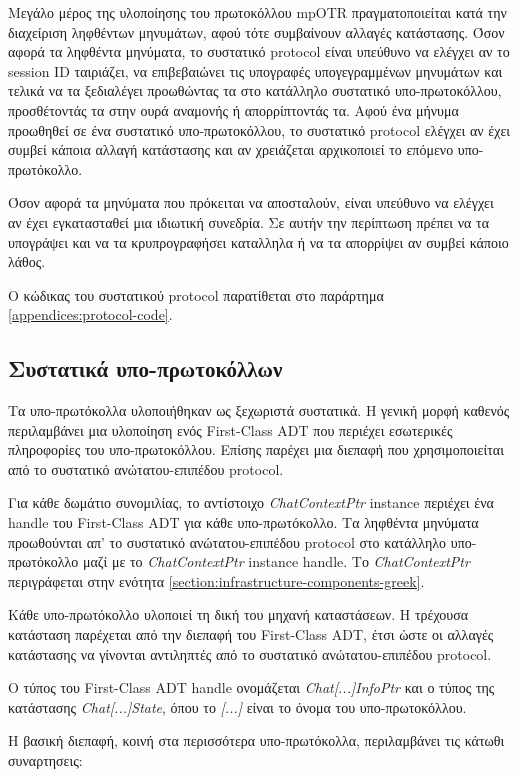 Μεγάλο μέρος της υλοποίησης του πρωτοκόλλου mpOTR πραγματοποιείται κατά την διαχείριση ληφθέντων μηνυμάτων, αφού τότε συμβαίνουν αλλαγές κατάστασης. Όσον αφορά τα ληφθέντα μηνύματα, το συστατικό protocol είναι υπεύθυνο να ελέγχει αν το session ID ταιριάζει, να επιβεβαιώνει τις υπογραφές υπογεγραμμένων μηνυμάτων και τελικά να τα ξεδιαλέγει προωθώντας τα στο κατάλληλο συστατικό υπο-πρωτοκόλλου, προσθέτοντάς τα στην ουρά αναμονής ή απορρίπτοντάς τα. Αφού ένα μήνυμα προωθηθεί σε ένα συστατικό υπο-πρωτοκόλλου, το συστατικό protocol ελέγχει αν έχει συμβεί κάποια αλλαγή κατάστασης και αν χρειάζεται αρχικοποιεί το επόμενο υπο-πρωτόκολλο.

Όσον αφορά τα μηνύματα που πρόκειται να αποσταλούν, είναι υπεύθυνο να ελέγχει αν έχει εγκατασταθεί μια ιδιωτική συνεδρία. Σε αυτήν την περίπτωση πρέπει να τα υπογράψει και να τα κρυπρογραφήσει καταλληλα ή να τα απορρίψει αν συμβεί κάποιο λάθος.

Ο κώδικας του συστατικού protocol παρατίθεται στο παράρτημα \ref{appendices:protocol-code}.

\subsection{Συστατικά υπο-πρωτοκόλλων}
Τα υπο-πρωτόκολλα υλοποιήθηκαν ως ξεχωριστά συστατικά. Η γενική μορφή καθενός περιλαμβάνει μια υλοποίηση ενός First-Class ADT που περιέχει εσωτερικές πληροφορίες του υπο-πρωτοκόλλου. Επίσης παρέχει μια διεπαφή που χρησιμοποιείται από το συστατικό ανώτατου-επιπέδου protocol.

Για κάθε δωμάτιο συνομιλίας, το αντίστοιχο \emph{ChatContextPtr} instance περιέχει ένα handle του First-Class ADT για κάθε υπο-πρωτόκολλο. Τα ληφθέντα μηνύματα προωθούνται απ' το συστατικό ανώτατου-επιπέδου protocol στο κατάλληλο υπο-πρωτόκολλο μαζί με το \emph{ChatContextPtr} instance handle. Το \emph{ChatContextPtr} περιγράφεται στην ενότητα \ref{section:infrastructure-components-greek}.

Κάθε υπο-πρωτόκολλο υλοποιεί τη δική του μηχανή καταστάσεων. Η τρέχουσα κατάσταση παρέχεται από την διεπαφή του First-Class ADT, έτσι ώστε οι αλλαγές κατάστασης να γίνονται αντιληπτές από το συστατικό ανώτατου-επιπέδου protocol.

Ο τύπος του First-Class ADT handle ονομάζεται \emph{Chat[...]InfoPtr} και ο τύπος της κατάστασης \emph{Chat[...]State}, όπου το \emph{[...]} είναι το όνομα του υπο-πρωτοκόλλου.

Η βασική διεπαφή, κοινή στα περισσότερα υπο-πρωτόκολλα, περιλαμβάνει τις κάτωθι συναρτησεις:

